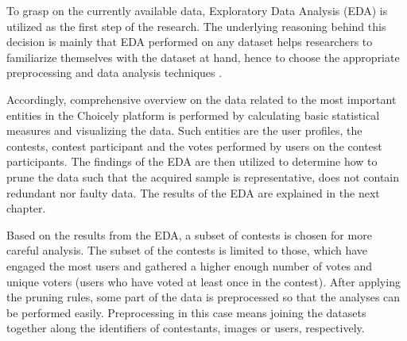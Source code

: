 
To grasp on the currently available data, Exploratory Data Analysis (EDA) is utilized as the first step of the research. The underlying reasoning behind this decision is mainly that EDA performed on any dataset helps researchers to familiarize themselves with the dataset at hand, hence to choose the appropriate preprocessing and data analysis techniques \cite{introtodatamining}. 

Accordingly, comprehensive overview on the data related to the most important entities in the Choicely platform is performed by calculating basic statistical measures and visualizing the data. Such entities are the user profiles, the contests, contest participant and the votes performed by users on the contest participants. The findings of the EDA are then utilized to determine how to prune the data such that the acquired sample is representative, does not contain redundant nor faulty data. The results of the EDA are explained in the next chapter. 

Based on the results from the EDA, a subset of contests is chosen for more careful analysis. The subset of the contests is limited to those, which have engaged the most users and gathered a higher enough number of votes and unique voters (users who have voted at least once in the contest). After applying the pruning rules, some part of the data is preprocessed so that the analyses can be performed easily. Preprocessing in this case means joining the datasets together along the identifiers of contestants, images or users, respectively.  

